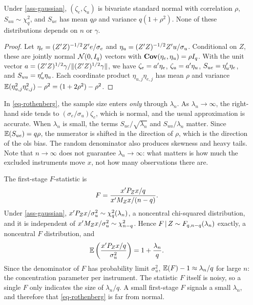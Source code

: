\documentclass[a4paper,12pt]{article}
\begin{document}
\begin{proposition}\label{prop-building-blocks}
	Under \autoref{ass-gaussian},
	$(\zeta_e,\zeta_u)$ is bivariate standard normal with correlation $\rho$,
	$S_{uu}\sim\chi^2_q$, and $S_{ue}$ has mean $q\rho$ and variance $q(1+\rho^2)$.
	None of these distributions depends on $n$ or $\gamma$.
\end{proposition}
\begin{proof}
	Let $\eta_e=(Z^{\prime} Z)^{-1/2}Z^{\prime} e/\sigma_e$ and $\eta_u=(Z^{\prime} Z)^{-1/2}Z^{\prime} u/\sigma_u$.
	Conditional on $Z$, these are jointly normal $\operatorname{\mathcal{N}}(0,I_q)$ vectors with $\operatorname{\text{\textrm{\upshape\textbf{Cov}}}}(\eta_e,\eta_u)=\rho I_q$.
	With the unit vector $a=(Z^{\prime} Z)^{1/2}\gamma/\|(Z^{\prime} Z)^{1/2}\gamma\|$,
	we have $\zeta_e=a^{\prime}\eta_e$, $\zeta_u=a^{\prime}\eta_u$, $S_{ue}=\eta_u^{\prime}\eta_e$, and $S_{uu}=\eta_u^{\prime}\eta_u$.
	Each coordinate product $\eta_{u,j}\eta_{e,j}$ has mean $\rho$ and variance
	$\operatorname{\mathbb{E}}(\eta_{u,j}^2\eta_{e,j}^2)-\rho^2=(1+2\rho^2)-\rho^2$.
\end{proof}

\begin{remark}\label{rmk-effective}
	In \eqref{eq-rothenberg},
	the sample size enters \emph{only} through $\lambda_n$.
	As $\lambda_n\to\infty$, the right-hand side tends to $(\sigma_e/\sigma_u)\zeta_e$,
	which is normal, and the usual approximation is accurate.
	When $\lambda_n$ is small, the terms $S_{ue}/\sqrt{\lambda_n}$ and $S_{uu}/\lambda_n$ matter.
	Since $\operatorname{\mathbb{E}}(S_{ue})=q\rho$, the numerator is shifted in the direction of $\rho$, which is the direction of the \gls{ols} bias.
	The random denominator also produces skewness and heavy tails.
	Note that $n\to\infty$ does not guarantee $\lambda_n\to\infty$:
	what matters is how much the excluded instruments move $x$, not how many observations there are.
\end{remark}

\begin{remark}\label{rmk-first-stage-f}
	The first-stage $F$-statistic is
	\begin{align*}
		F=\frac{x^{\prime} P_Zx/q}{x^{\prime} M_Zx/(n-q)}.
	\end{align*}
	Under \autoref{ass-gaussian}, $x^{\prime} P_Zx/\sigma_u^2\sim\chi^2_q(\lambda_n)$, a noncentral chi-squared distribution,
	and it is independent of $x^{\prime} M_Zx/\sigma_u^2\sim\chi^2_{n-q}$.
	Hence $F\mathpunct{}|\mathpunct{} Z\sim F_{q,n-q}(\lambda_n)$ exactly, a noncentral $F$ distribution, and
	\begin{align*}
		\operatorname{\mathbb{E}} \left(\frac{x^{\prime} P_Z x/q}{\sigma_u^2}\right)
		= 1 + \frac{\lambda_n}{q}.
	\end{align*}
	Since the denominator of $F$ has probability limit $\sigma_u^2$, $\operatorname{\mathbb{E}}(F)-1\approx\lambda_n/q$ for large $n$:
	the concentration parameter per instrument.
	The statistic $F$ itself is noisy, so a single $F$ only indicates the size of $\lambda_n/q$.
	A small first-stage $F$ signals a small $\lambda_n$, and therefore that \eqref{eq-rothenberg} is far from normal.
\end{remark}
\end{document}
